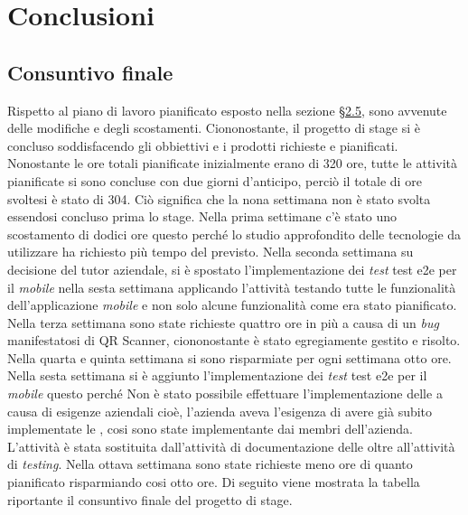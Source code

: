
\chapter{Conclusioni}
\label{cap:conclusioni}

\section{Consuntivo finale}
Rispetto al piano di lavoro pianificato esposto nella sezione \hyperref[cap:pianificazione]{§2.5}, sono avvenute delle modifiche e degli scostamenti. Ciononostante, il progetto di stage si è concluso soddisfacendo gli obbiettivi e i prodotti richieste e pianificati. Nonostante le ore totali pianificate inizialmente erano di 320 ore, tutte le attività pianificate si sono concluse con due giorni d'anticipo, perciò il totale di ore svoltesi è stato di 304. Ciò significa che la nona settimana non è stato svolta essendosi concluso prima lo stage. Nella prima settimane c'è stato uno scostamento di dodici ore questo perché lo studio approfondito delle tecnologie da utilizzare ha richiesto più tempo del previsto. Nella seconda settimana su decisione del tutor aziendale, si è spostato l'implementazione dei \emph{test} \gls{test e2e} per il \emph{mobile} nella sesta settimana applicando l'attività testando tutte le funzionalità dell'applicazione \emph{mobile} e non solo alcune funzionalità come era stato pianificato. Nella terza settimana sono state richieste quattro ore in più a causa di un \emph{bug} manifestatosi di QR Scanner, ciononostante è stato egregiamente gestito e risolto. Nella quarta e quinta settimana si sono risparmiate per ogni settimana otto ore. Nella sesta settimana si è aggiunto l'implementazione dei \emph{test} \gls{test e2e} per il \emph{mobile} questo perché Non è stato possibile effettuare l'implementazione delle \textcolor{SchoolColor}{\ap{[g]}} a causa di esigenze aziendali cioè, l'azienda aveva l'esigenza di avere già subito implementate le \textcolor{SchoolColor}{\ap{[g]}}, cosi sono state implementante dai membri dell'azienda. L'attività è stata sostituita dall'attività di documentazione delle \textcolor{SchoolColor}{\ap{[g]}} oltre all'attività di \emph{testing}.
Nella ottava settimana sono state richieste meno ore di quanto pianificato risparmiando cosi otto ore.
Di seguito viene mostrata la tabella riportante il consuntivo finale del progetto di stage.

